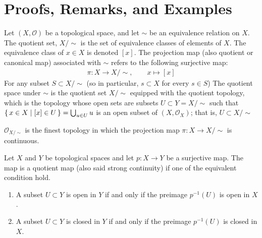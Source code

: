 \section{Proofs, Remarks, and Examples}
\begin{defbox}
    \begin{definition}
        Let \((X, \mathcal{O})\) be a {\color{mathif}topological space}, and let \(\sim\) be an {\color{mathif}equivalence relation} on \(X\). The {\color{maththen}quotient set}, \(X / \sim\) is the {\color{mathobj}set} of {\color{mathobj}equivalence classes} of elements of \(X\). The equivalence class of \(x \in X\) is {\color{mathrem}denoted} \([x]\). The {\color{maththen}projection map} (also {\color{mathrem}quotient} or {\color{mathrem}canonical map}) associated with \(\sim\) refers to the following {\color{mathif}surjective map}:
        \begin{align*}
            \pi: X \longrightarrow X / \sim, \qquad x \mapsto [x]
        \end{align*}
        For any subset \(S \subset X / \sim\) (so in particular, \(s \subset X\) for every \(s \in S\))
        The quotient space under \(\sim\) is the quotient set \(X / \sim\) equipped with the quotient topology, which is the topology whose open sets are subsets \(U \subset Y = X / \sim\) such that \(\left\{\, x \in X \mid [x] \in U \,\right\} = \bigcup_{u \in U}u\) is an open subset of \((X, \mathcal{O}_X)\); that is, \(U \subset X / \sim\)
    \end{definition}
\end{defbox}
\begin{thmbox}
    \begin{proposition}
        \(\mathcal{O}_{X / \sim}\) is the {\color{maththen}finest} {\color{mathobj}topology} in which the {\color{mathif}projection map} \(\pi: X \longrightarrow X / \sim\) is {\color{mathif}continuous}.
    \end{proposition}
\end{thmbox}
\begin{defbox}
    Let \(X\) and \(Y\) be topological spaces and let \(p: X \longrightarrow Y\) be a surjective map. The map is a quotient map (also said strong continuity) if one of the equivalent condition hold.
    \begin{enumerate}
        \item A subset \(U \subset Y\) is open in \(Y\) if and only if the preimage \(p^{-1}(U)\) is open in \(X\).
        \item A subset \(U \subset Y\) is closed in \(Y\) if and only if the preimage \(p^{-1}(U)\) is closed in \(X\).
    \end{enumerate}
\end{defbox}
